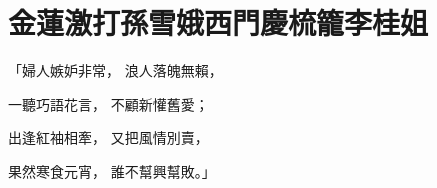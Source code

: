%

\chapter{金蓮激打孫雪娥\KG 西門慶梳籠李桂姐}

\begin{showcontents}{}



「婦人嫉妒非常，  浪人落魄無賴，

一聽巧語花言，  不顧新懽舊愛；

出逢紅袖相牽，  又把風情別賣，

果然寒食元宵，  誰不幫興幫敗。」


\end{showcontents}

